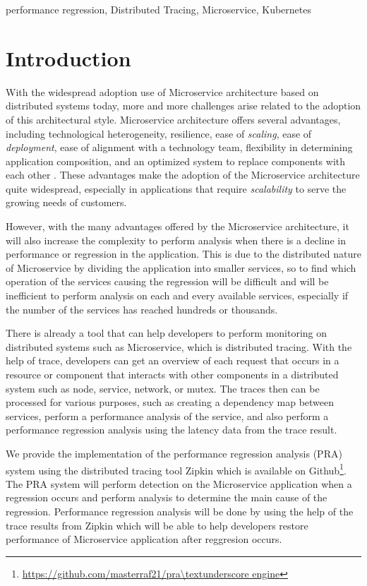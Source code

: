 \documentclass[conference]{configs/IEEEtran}
\begin{document}
\begin{IEEEkeywords}
performance regression, Distributed Tracing, Microservice, Kubernetes
\end{IEEEkeywords}

\section{Introduction}
\label{1}
With the widespread adoption use of Microservice architecture based on distributed systems today, more and more challenges arise related to the adoption of this architectural style. Microservice architecture offers several advantages, including technological heterogeneity, resilience, ease of \textit{scaling}, ease of \textit{deployment}, ease of alignment with a technology team, flexibility in determining application composition, and an optimized system to replace components with each other \cite{building-microservices}. These advantages make the adoption of the Microservice architecture quite widespread, especially in applications that require \textit{scalability} to serve the growing needs of customers.

However, with the many advantages offered by the Microservice architecture, it will also increase the complexity to perform analysis when there is a decline in performance or regression in the application. This is due to the distributed nature of Microservice by dividing the application into smaller services, so to find which operation of the services causing the regression will be difficult and will be inefficient to perform analysis on each and every available services, especially if the number of the services has reached hundreds or thousands.

There is already a tool that can help developers to perform monitoring on distributed systems such as Microservice, which is distributed tracing. With the help of trace, developers can get an overview of each request that occurs in a resource or component that interacts with other components in a distributed system such as node, service, network, or mutex. The traces then can be processed for various purposes, such as creating a dependency map between services, perform a performance analysis of the service, and also perform a performance regression analysis using the latency data from the trace result.

We provide the implementation of the performance regression analysis (PRA) system using the distributed tracing tool Zipkin which is available on Github\footnote{\url{https://github.com/masterraf21/pra\textunderscore engine}}. The PRA system will perform detection on the Microservice application when a regression occurs and perform analysis to determine the main cause of the regression. Performance regression analysis will be done by using the help of the trace results from Zipkin which will be able to help developers restore performance of Microservice application after reggresion occurs.
\end{document}
